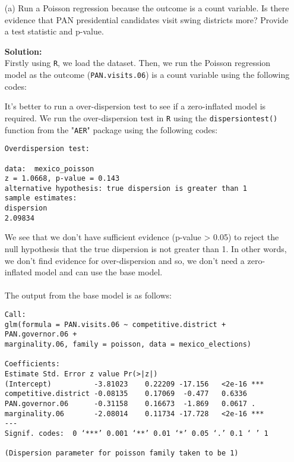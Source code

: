 \documentclass[12pt,letterpaper]{article}
\begin{document}
\begin{enumerate}
	\item [(a)]
	Run a Poisson regression because the outcome is a count variable. Is there evidence that PAN presidential candidates visit swing districts more? Provide a test statistic and p-value.

\vspace*{.2cm}
\noindent\textbf{Solution:\\}
Firstly using \texttt{R}, we load the dataset. Then, we run the Poisson regression model as the outcome (\texttt{PAN.visits.06}) is a count variable using the following codes:


It's better to run a over-dispersion test to see if a zero-inflated model is required. We run the over-dispersion test in \texttt{R} using the \texttt{dispersiontest()} function from the "\texttt{AER}" package using the following codes:


\begin{Verbatim}
Overdispersion test:

data:  mexico_poisson
z = 1.0668, p-value = 0.143
alternative hypothesis: true dispersion is greater than 1
sample estimates:
dispersion 
2.09834 
\end{Verbatim}

We see that we don't have sufficient evidence (p-value > 0.05) to reject the null hypothesis that the true dispersion is not greater than 1.
In other words, we don't find evidence for over-dispersion and so, we don't need a zero-inflated model and can use the base model.\\
\\The output from the base model is as follows:

\begin{Verbatim}
Call:
glm(formula = PAN.visits.06 ~ competitive.district + PAN.governor.06 + 
marginality.06, family = poisson, data = mexico_elections)

Coefficients:
Estimate Std. Error z value Pr(>|z|)    
(Intercept)          -3.81023    0.22209 -17.156   <2e-16 ***
competitive.district -0.08135    0.17069  -0.477   0.6336    
PAN.governor.06      -0.31158    0.16673  -1.869   0.0617 .  
marginality.06       -2.08014    0.11734 -17.728   <2e-16 ***
---
Signif. codes:  0 ‘***’ 0.001 ‘**’ 0.01 ‘*’ 0.05 ‘.’ 0.1 ‘ ’ 1

(Dispersion parameter for poisson family taken to be 1)


\end{Verbatim}
\end{enumerate}
\end{document}
